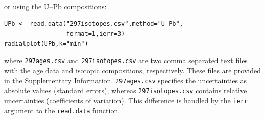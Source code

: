 \documentclass{article}
\begin{document}
\noindent or using the U--Pb compositions:

\begin{verbatim}
UPb <- read.data("297isotopes.csv",method="U-Pb",
                 format=1,ierr=3)
radialplot(UPb,k="min")
\end{verbatim}

\noindent where \texttt{297ages.csv} and \texttt{297isotopes.csv} are
two comma separated text files with the age data and isotopic
compositions, respectively. These files are provided in the
Supplementary Information. \texttt{297ages.csv} specifies the
uncertainties as absolute values (standard errors), whereas
\texttt{297isotopes.csv} contains relative uncertainties (coefficients
of variation). This difference is handled by the \texttt{ierr}
argument to the \texttt{read.data} function.

%
%
\end{document}
